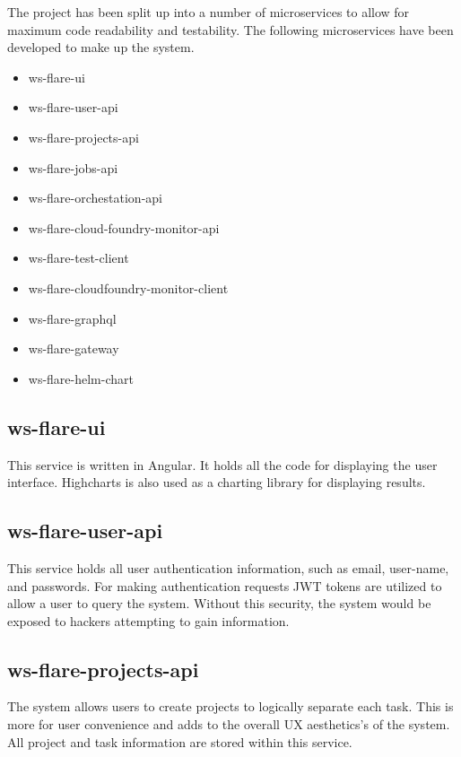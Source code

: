 The project has been split up into a number of microservices to allow for maximum code readability and testability. The following microservices have been developed to make up the system.

\begin{itemize}
  \item ws-flare-ui
  \item ws-flare-user-api
  \item ws-flare-projects-api
  \item ws-flare-jobs-api
  \item ws-flare-orchestation-api
  \item ws-flare-cloud-foundry-monitor-api
  \item ws-flare-test-client
  \item ws-flare-cloudfoundry-monitor-client
  \item ws-flare-graphql
  \item ws-flare-gateway
  \item ws-flare-helm-chart
\end{itemize}

\subsection{ws-flare-ui}

This service is written in Angular. It holds all the code for displaying the user interface. Highcharts is also used as a charting library for displaying results.

\subsection{ws-flare-user-api}

This service holds all user authentication information, such as email, user-name, and passwords. For making authentication requests JWT tokens are utilized to allow a user to query the system. Without this security, the system would be exposed to hackers attempting to gain information.

\subsection{ws-flare-projects-api}

The system allows users to create projects to logically separate each task. This is more for user convenience and adds to the overall UX aesthetics's of the system. All project and task information are stored within this service. 

